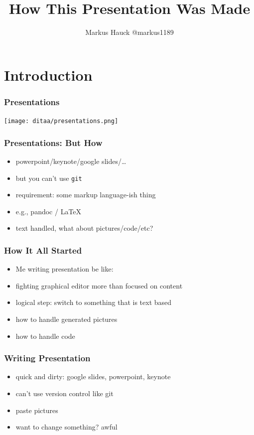 \documentclass{beamer}
\title{How This Presentation Was Made}
\author{Markus Hauck @markus1189}
\begin{document}
\begin{frame}
  \titlepage{}
\end{frame}

\section{Introduction}\label{sec:introduction}

\begin{frame}
  \frametitle{Presentations}
  \begin{center}
    \texttt{[image: ditaa/presentations.png]}
  \end{center}
\end{frame}

\begin{frame}
  \frametitle{Presentations: But How}
  \begin{itemize}
  \item powerpoint/keynote/google slides/\ldots{}
  \item but you can't use \texttt{git}
  \item requirement: some markup language-ish thing
  \item e.g., pandoc / LaTeX
  \item text handled, what about pictures/code/etc?
  \end{itemize}
\end{frame}

\begin{frame}
  \frametitle{How It All Started}
  \begin{itemize}
  \item Me writing presentation be like:
  \item fighting graphical editor more than focused on content
  \item logical step: switch to something that is text based
  \item how to handle generated pictures
  \item how to handle code
  \end{itemize}
\end{frame}

\begin{frame}
  \frametitle{Writing Presentation}
  \begin{itemize}
  \item quick and dirty: google slides, powerpoint, keynote
  \item can't use version control like git
  \item paste pictures
  \item want to change something? awful
  \end{itemize}
\end{frame}
\end{document}

